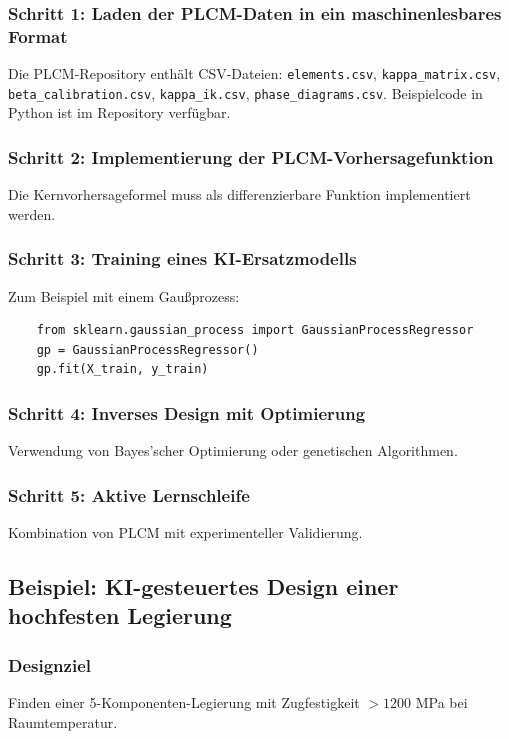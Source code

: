 \documentclass[12pt,a4paper]{article}
\begin{document}
\subsubsection{Schritt 1: Laden der PLCM-Daten in ein maschinenlesbares Format}
Die PLCM-Repository enthält CSV-Dateien: \texttt{elements.csv}, \texttt{kappa\_matrix.csv}, \texttt{beta\_calibration.csv}, \texttt{kappa\_ik.csv}, \texttt{phase\_diagrams.csv}. Beispielcode in Python ist im Repository verfügbar.

\subsubsection{Schritt 2: Implementierung der PLCM-Vorhersagefunktion}
Die Kernvorhersageformel muss als differenzierbare Funktion implementiert werden.

\subsubsection{Schritt 3: Training eines KI-Ersatzmodells}
Zum Beispiel mit einem Gaußprozess:
\begin{verbatim}
	from sklearn.gaussian_process import GaussianProcessRegressor
	gp = GaussianProcessRegressor()
	gp.fit(X_train, y_train)
\end{verbatim}

\subsubsection{Schritt 4: Inverses Design mit Optimierung}
Verwendung von Bayes'scher Optimierung oder genetischen Algorithmen.

\subsubsection{Schritt 5: Aktive Lernschleife}
Kombination von PLCM mit experimenteller Validierung.

\subsection{Beispiel: KI-gesteuertes Design einer hochfesten Legierung}

\subsubsection{Designziel}
Finden einer 5-Komponenten-Legierung mit Zugfestigkeit \(> 1200\) MPa bei Raumtemperatur.
\end{document}
